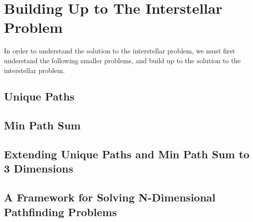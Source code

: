 \section{Building Up to The Interstellar Problem}
In order to understand the solution to the interstellar problem, we must first understand the following smaller problems,
and build up to the solution to the interstellar problem.

\subsection{Unique Paths}


\subsection{Min Path Sum}


\subsection{Extending Unique Paths and Min Path Sum to 3 Dimensions}


\subsection{A Framework for Solving N-Dimensional Pathfinding Problems}
